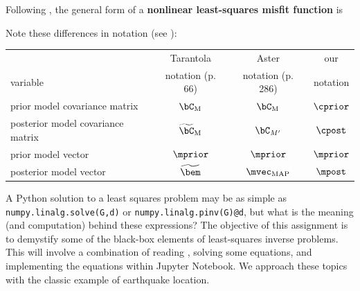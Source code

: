 \documentclass[11pt,titlepage,fleqn]{article}
\begin{document}
Following \citet[][p.~205]{Tarantola2005}, the general form of a {\bf nonlinear least-squares misfit function} is
%

%
Note these differences in notation (see ):

\vspace{0.2cm}
\begin{tabular}{l|c|c|c}
\hline
                                    & Tarantola         & Aster    & our \\ 
variable                            & notation (p. 66) & notation (p. 286)  & notation \\ \hline
prior model covariance matrix       & $\bC_{\rm M}$                & $\bC_{\rm M}$    & $\cprior$    \\ \hline
posterior model covariance matrix   & $\widetilde{\bC}_{\rm M}$    & $\bC_{M'}$      & $\cpost$     \\ \hline
prior model vector                  & $\mprior$                  & $\mprior$      & $\mprior$     \\ \hline
posterior model vector              & $\widetilde{\bem}$         & $\mvec_{\rm MAP}$ & $\mpost$     \\ \hline
\hline
\end{tabular}
\vspace{0.2cm}

\nocite{Aster}

\medskip\noindent
A Python solution to a least squares problem may be as simple as \verb+numpy.linalg.solve(G,d)+ or \verb+numpy.linalg.pinv(G)@d+, but what is the meaning (and computation) behind these expressions? The objective of this assignment is to demystify some of the black-box elements of least-squares inverse problems. This will involve a combination of reading \citet{Tarantola2005}, solving some equations, and implementing the equations within Jupyter Notebook. We approach these topics with the classic example of earthquake location.
\end{document}
